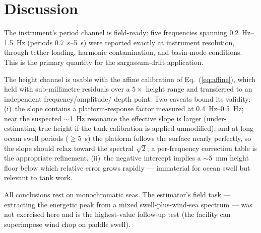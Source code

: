 \documentclass[11pt,a4paper]{article}
\begin{document}
\section{Discussion}
The instrument's period channel is field-ready: five frequencies spanning
\SIrange{0.2}{1.5}{\hertz} (periods \SIrange{0.7}{5}{\second}) were reported
exactly at instrument resolution, through tether loading, harmonic
contamination, and basin-mode conditions. This is the primary quantity for
the sargassum-drift application.

The height channel is usable with the affine calibration of
Eq.~(\ref{eq:affine}), which held with sub-millimetre residuals over a
$5\times$ height range and transferred to an independent frequency/amplitude/
depth point. Two caveats bound its validity: (i)~the slope contains a
platform-response factor measured at \SIrange{0.4}{0.5}{\hertz}; near the
suspected $\sim$\SI{1}{\hertz} resonance the effective slope is larger
(under-estimating true height if the tank calibration is applied
unmodified), and at long ocean swell periods
($\ge$\SI{5}{\second}) the platform follows the surface nearly perfectly, so
the slope should relax toward the spectral $\sqrt{2}$; a per-frequency
correction table is the appropriate refinement. (ii)~the negative intercept
implies a $\sim$\SI{5}{\milli\meter} height floor below which relative error
grows rapidly --- immaterial for ocean swell but relevant to tank work.

All conclusions rest on monochromatic seas. The estimator's field task ---
extracting the energetic peak from a mixed swell-plus-wind-sea spectrum ---
was not exercised here and is the highest-value follow-up test (the facility
can superimpose wind chop on paddle swell).
\end{document}

